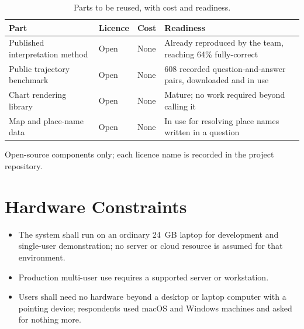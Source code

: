 \documentclass[12pt,a4paper]{report}
\begin{document}
\begin{table}[H]
  \centering
  \caption{Parts to be reused, with cost and readiness.}
  \label{tab:reuse}
  \small
  \begin{tabular}{@{}>{\raggedright\arraybackslash}p{3.6cm}
                    >{\raggedright\arraybackslash}p{2.2cm}
                    >{\raggedright\arraybackslash}p{2.6cm}
                    >{\raggedright\arraybackslash}p{5.4cm}@{}}
    \toprule[1.5pt]
    \textbf{Part} & \textbf{Licence} & \textbf{Cost} &
      \textbf{Readiness} \\
    \midrule
    Published interpretation method & Open & None &
      Already reproduced by the team, reaching 64\% fully-correct \\
    \addlinespace
    Public trajectory benchmark & Open & None &
      9{,}608 recorded question-and-answer pairs, downloaded and in use \\
    \addlinespace
    Chart rendering library & Open & None &
      Mature; no work required beyond calling it \\
    \addlinespace
    Map and place-name data & Open & None &
      In use for resolving place names written in a question \\
    \bottomrule[1.5pt]
  \end{tabular}
\end{table}

Open-source components only; each licence name is recorded in the project
repository.

\section{Hardware Constraints}
\label{sec:hardware-constraints}

\begin{itemize}
  \setlength{\itemsep}{0pt}
  \setlength{\parsep}{0pt}
  \item The system shall run on an ordinary 24~GB laptop for development and
    single-user demonstration; no server or cloud resource is assumed for
    that environment.
  \item Production multi-user use requires a supported server or
    workstation.
  \item Users shall need no hardware beyond a desktop or laptop computer
    with a pointing device; respondents used macOS and Windows machines and
    asked for nothing more.
\end{itemize}
\end{document}
